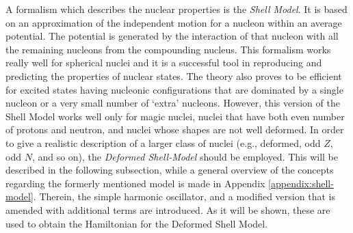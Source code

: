 A formalism which describes the nuclear properties is the \emph{Shell Model}. It is based on an approximation of the independent motion for a nucleon within an average potential. The potential is generated by the interaction of that nucleon with all the remaining nucleons from the compounding nucleus. This formalism works really well for spherical nuclei and it is a successful tool in reproducing and predicting the properties of nuclear states. The theory also proves to be efficient for excited states having nucleonic configurations that are dominated by a single nucleon or a very small number of `extra' nucleons. However, this version of the Shell Model works well only for magic nuclei, nuclei that have both even number of protons and neutron, and nuclei whose shapes are not well deformed. In order to give a realistic description of a larger class of nuclei (e.g., deformed, odd $Z$, odd $N$, and so on), the \emph{Deformed Shell-Model} should be employed. This will be described in the following subsection, while a general overview of the concepts regarding the formerly mentioned model is made in Appendix \ref{appendix:shell-model}. Therein, the simple harmonic oscillator, and a modified version that is amended with additional terms are introduced. As it will be shown, these are used to obtain the Hamiltonian for the Deformed Shell Model.



